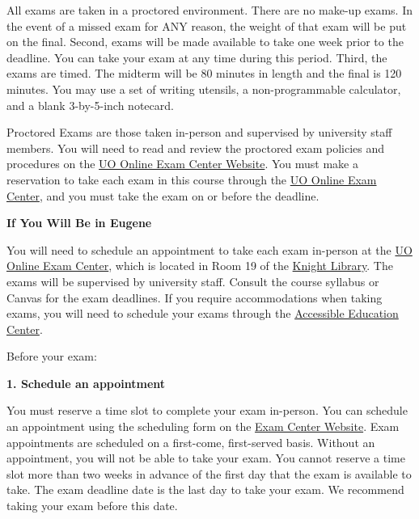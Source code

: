 \documentclass[10pt]{article}
\begin{document}
All exams are taken in a proctored environment. 
There are no make-up exams. 
In the event of a missed exam for ANY reason, the weight of that exam will be put on the final. 
Second, exams will be made available to take one week prior to the deadline. 
You can take your exam at any time during this period. 
Third, the exams are timed. 
The midterm will be 80 minutes in length and the final is 120 minutes. 
You may use a set of writing utensils, a non-programmable calculator, and a blank 3-by-5-inch notecard. 

\bigskip 

\noindent Proctored Exams are those taken in-person and supervised by university staff members. 
You will need to read and review the proctored exam policies and procedures on the \href{https://online.uoregon.edu/examcenter}{UO Online Exam Center Website}. 
You must make a reservation to take each exam in this course through the \href{https://online.uoregon.edu/}{UO Online Exam Center}, and you must take the exam on or before the deadline. 


\bigskip 
\textbf{If You Will Be in Eugene} 

\bigskip

\noindent You will need to schedule an appointment to take each exam in-person at the \href{https://online.uoregon.edu/examcenter}{UO Online Exam Center}, which is located in Room 19 of the \href{https://online.uoregon.edu/campus-proctoring}{Knight Library}. The exams will be supervised by university staff. Consult the course syllabus or Canvas for the exam deadlines. 
If you require accommodations when taking exams, you will need to schedule your exams through the \href{https://aec.uoregon.edu/}{Accessible Education Center}. 

\bigskip

Before your exam:

\bigskip

\textbf{1. Schedule an appointment}

\noindent You must reserve a time slot to complete your exam in-person. You can schedule an appointment using the scheduling form on the \href{https://online.uoregon.edu/campus-proctoring}{Exam Center Website}. Exam appointments are scheduled on a first-come, first-served basis. Without an appointment, you will not be able to take your exam. 
You cannot reserve a time slot more than two weeks in advance of the first day that the exam is available to take. The exam deadline date is the last day to take your exam. We recommend taking your exam before this date. 
\end{document}
